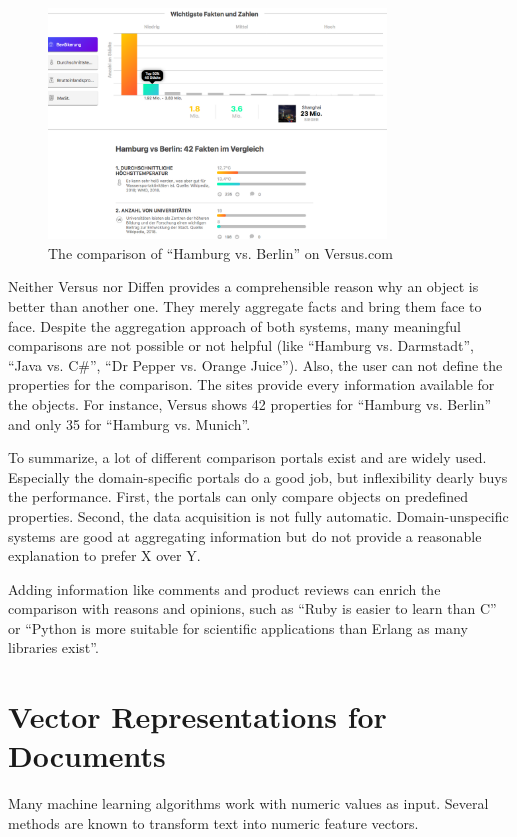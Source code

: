 \begin{figure}[htp]
    \centering
	\includegraphics[width=0.8\textwidth]{images/ds-sys/versus}
	\caption{The comparison of \enquote{Hamburg vs. Berlin} on Versus.com}
		\label{img:versus}
\end{figure}

Neither Versus nor Diffen provides a comprehensible reason why an object is better than another one. They merely aggregate facts and bring them face to face. Despite the aggregation approach of both systems, many meaningful comparisons are not possible or not helpful (like \enquote{Hamburg vs. Darmstadt}, \enquote{Java vs. C\#}, \enquote{Dr Pepper vs. Orange Juice}).
Also, the user can not define the properties for the comparison. The sites provide every information available for the objects. For instance, Versus shows 42 properties for \enquote{Hamburg vs. Berlin} and only 35 for \enquote{Hamburg vs. Munich}.
\newline

To summarize, a lot of different comparison portals exist and are widely used. Especially the domain-specific portals do a good job, but inflexibility dearly buys the performance. First, the portals can only compare objects on predefined properties. Second, the data acquisition is not fully automatic. Domain-unspecific systems are good at aggregating information but do not provide a reasonable explanation to prefer X over Y.

Adding information like comments and product reviews can enrich the comparison with reasons and opinions, such as \enquote{Ruby is easier to learn than C} or \enquote{Python is more suitable for scientific applications than Erlang as many libraries exist}.

\FloatBarrier

\section{Vector Representations for Documents}
Many machine learning algorithms work with numeric values as input. Several methods are known to transform text into numeric feature vectors.
